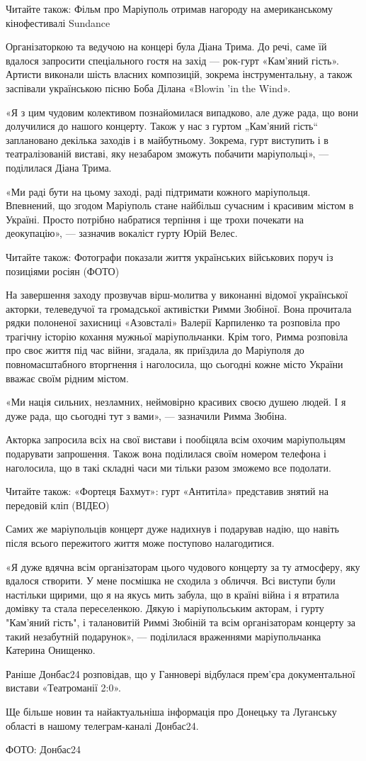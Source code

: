 Читайте також: Фільм про Маріуполь отримав нагороду на американському кінофестивалі Sundance

Організаторкою та ведучою на концері була Діана Трима. До речі, саме їй вдалося
запросити спеціального гостя на захід — рок-гурт «Кам’яний гість». Артисти
виконали шість власних композицій, зокрема інструментальну, а також заспівали
українською пісню Боба Ділана «Blowin 'in the Wind».

«Я з цим чудовим колективом познайомилася випадково, але дуже рада, що вони
долучилися до нашого концерту. Також у нас з гуртом „Кам'яний гість“
заплановано декілька заходів і в майбутньому. Зокрема, гурт виступить і в
театралізованій виставі, яку незабаром зможуть побачити маріупольці», —
поділилася Діана Трима.

«Ми раді бути на цьому заході, раді підтримати кожного маріупольця. Впевнений,
що згодом Маріуполь стане найбільш сучасним і красивим містом в Україні. Просто
потрібно набратися терпіння і ще трохи почекати на деокупацію», — зазначив
вокаліст гурту Юрій Велес.

Читайте також: Фотографи показали життя українських військових поруч із
позиціями росіян (ФОТО)

На завершення заходу прозвучав вірш-молитва у виконанні відомої української
акторки, телеведучої та громадської активістки Римми Зюбіної. Вона прочитала
рядки полоненої захисниці «Азовсталі» Валерії Карпиленко та розповіла про
трагічну історію кохання мужньої маріупольчанки. Крім того, Римма розповіла про
своє життя під час війни, згадала, як приїздила до Маріуполя до
повномасштабного вторгнення і наголосила, що сьогодні кожне місто України
вважає своїм рідним містом.

«Ми нація сильних, незламних, неймовірно красивих своєю душею людей. І я дуже
рада, що сьогодні тут з вами», — зазначили Римма Зюбіна.

Акторка запросила всіх на свої вистави і пообіцяла всім охочим маріупольцям
подарувати запрошення. Також вона поділилася своїм номером телефона і
наголосила, що в такі складні часи ми тільки разом зможемо все подолати.

Читайте також: «Фортеця Бахмут»: гурт «Антитіла» представив знятий на передовій
кліп (ВІДЕО)


Самих же маріупольців концерт дуже надихнув і подарував надію, що навіть після всього пережитого життя може поступово налагодитися.

«Я дуже вдячна всім організаторам цього чудового концерту за ту атмосферу, яку
вдалося створити. У мене посмішка не сходила з обличчя. Всі виступи були
настільки щирими, що я на якусь мить забула, що в країні війна і я втратила
домівку та стала переселенкою. Дякую і маріупольським акторам, і гурту
"Кам'яний гість", і талановитій Риммі Зюбіній та всім організаторам концерту за
такий незабутній подарунок», — поділилася враженнями маріупольчанка Катерина
Онищенко.

Раніше Донбас24 розповідав, що у Ганновері відбулася прем'єра документальної
вистави «Театроманії 2:0».

Ще більше новин та найактуальніша інформація про Донецьку та Луганську області
в нашому телеграм-каналі Донбас24.

ФОТО: Донбас24
